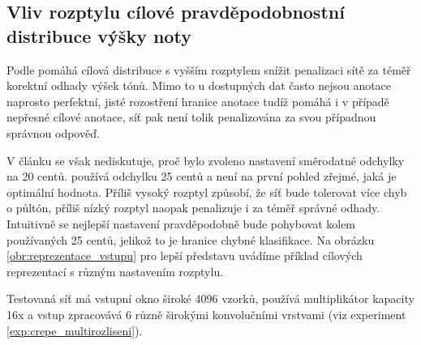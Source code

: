 \subsection{Vliv rozptylu cílové pravděpodobnostní distribuce výšky noty}

Podle \cite{Bittner2017} pomáhá cílová distribuce s vyšším rozptylem snížit penalizaci sítě za téměř korektní odhady výšek tónů. Mimo to u dostupných dat často nejsou anotace naprosto perfektní, jisté rozostření hranice anotace tudíž pomáhá i v případě nepřesné cílové anotace, síť pak není tolik penalizována za svou případnou správnou odpověď. 

V článku se však nediskutuje, proč bylo zvoleno nastavení směrodatné odchylky na 20 centů. \cite{Kim2018} používá odchylku 25 centů a není na první pohled zřejmé, jaká je optimální hodnota. Příliš vysoký rozptyl způsobí, že síť bude tolerovat více chyb o půltón, příliš nízký rozptyl naopak penalizuje i za téměř správné odhady. Intuitivně se nejlepší nastavení pravděpodobně bude pohybovat kolem používaných 25 centů, jelikož to je hranice chybné klasifikace. Na obrázku \ref{obr:reprezentace_vstupu} pro lepší představu uvádíme příklad cílových reprezentací s různým nastavením rozptylu.



Testovaná síť má vstupní okno široké 4096 vzorků, používá multiplikátor kapacity 16x a vstup zpracovává 6 různě širokými konvolučními vrstvami (viz experiment \ref{exp:crepe_multirozliseni}).


